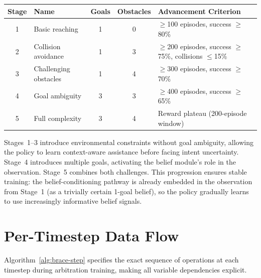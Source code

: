 \documentclass[11pt]{article}
\begin{document}
\begin{center}
\small
\begin{tabular}{@{}clccp{5cm}@{}}
\toprule
Stage & Name & Goals & Obstacles & Advancement Criterion \\
\midrule
1 & Basic reaching & 1 & 0 & $\geq$100 episodes, success $\geq$80\% \\
2 & Collision avoidance & 1 & 3 & $\geq$200 episodes, success $\geq$75\%, collisions $\leq$15\% \\
3 & Challenging obstacles & 1 & 4 & $\geq$300 episodes, success $\geq$70\% \\
4 & Goal ambiguity & 3 & 3 & $\geq$400 episodes, success $\geq$65\% \\
5 & Full complexity & 3 & 4 & Reward plateau (200-episode window) \\
\bottomrule
\end{tabular}
\end{center}

Stages~1--3 introduce environmental constraints without goal ambiguity, allowing the policy to learn context-aware assistance before facing intent uncertainty.
Stage~4 introduces multiple goals, activating the belief module's role in the observation.
Stage~5 combines both challenges.
This progression ensures stable training: the belief-conditioning pathway is already embedded in the observation from Stage~1 (as a trivially certain 1-goal belief), so the policy gradually learns to use increasingly informative belief signals.


\section{Per-Timestep Data Flow}
\label{sec:dataflow}

Algorithm~\ref{alg:brace-step} specifies the exact sequence of operations at each timestep during arbitration training, making all variable dependencies explicit.
\end{document}
